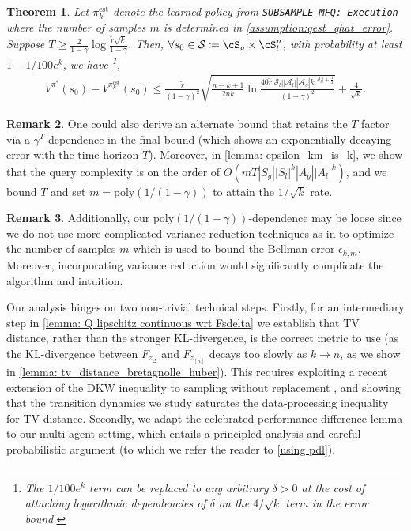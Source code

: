 \documentclass{article}
\theoremstyle{plain}
\newtheorem{theorem}{Theorem}[section]
\theoremstyle{definition}
\newtheorem{remark}[theorem]{Remark}
\def\est{\mathrm{est}}
\begin{document}
\begin{theorem} \label{theorem: performance_difference_lemma_applied}Let ${\pi}^\est_k$ denote the learned policy from \emph{\texttt{SUBSAMPLE-MFQ: Execution}} where the number of samples $m$ is determined in \cref{assumption:qest_qhat_error}. Suppose $T\geq\frac{2}{1-\gamma}\log\frac{\tilde{r}\sqrt{k}}{1-\gamma}$. Then, $\forall s_0 \in \mathcal{S}\coloneq \cS_g\times\cS_l^n$, with probability at least $1 - 1/100e^k$, we have \footnote{The $1/100e^k$ term can be replaced to any arbitrary $\delta>0$ at the cost of attaching logarithmic dependencies of $\delta$ on the $4/\sqrt{k}$ term in the error bound.},
\begin{align*}
    V^{\pi^*}(s_0) - V^{{\pi}_{k}^\est}(s_0) \leq \frac{\tilde{r}}{(1-\gamma)^2}\sqrt{\frac{n-k+1}{2nk}\ln\frac{40\tilde{r}|\mathcal{S}_l||\mathcal{A}_l||\mathcal{A}_g|k^{|\mathcal{A}_l|+\frac{1}{2}}}{(1-\gamma)^2}}\!+\!\frac{4}{\sqrt{k}}.
    \end{align*}
\end{theorem}

\begin{remark}One could also derive an alternate bound that retains the $T$ factor via a $\gamma^T$ dependence in the final bound (which shows an exponentially decaying error with the time horizon $T$). Moreover, in \cref{lemma: epsilon_km_is_k}, we show that the query complexity is on the order of $O(mT|S_g||S_l|^k|A_g||A_l|^k)$, and we bound $T$ and set $m = \mathrm{poly}(1/(1-\gamma))$ to attain the $1/\sqrt{k}$ rate. 
\end{remark}

\begin{remark}
    Additionally,  our $\mathrm{poly}(1/(1-\gamma))$-dependence may be loose since we do not use more complicated variance reduction techniques as in \cite{sidford2018near,Sidford2018VarianceRV, wainwright2019variance, jin2024truncated} to optimize the number of samples $m$ which is used to bound the Bellman error $\epsilon_{k,m}$. Moreover, incorporating variance reduction would significantly complicate the algorithm and intuition.


\end{remark}
 
 Our analysis hinges on two non‐trivial technical steps. Firstly, for an intermediary step in \cref{lemma: Q lipschitz continuous wrt Fsdelta} we establish that TV distance, rather than the stronger KL-divergence, is the correct metric to use (as the KL-divergence between $F_{z_\Delta}$ and $F_{z_{[n]}}$ decays too slowly as $k\to n$, as we show in \cref{lemma: tv_distance_bretagnolle_huber}). This requires exploiting a recent extension of the DKW inequality to sampling without replacement \citep{anand2024efficient}, and showing that the transition dynamics we study saturates the data‐processing inequality for TV-distance. Secondly, we adapt the celebrated performance‐difference lemma \citep{Kakade+Langford:2002} to our multi-agent setting, which entails a principled analysis and careful probabilistic argument (to which we refer the reader to \cref{using pdl}).
\end{document}
